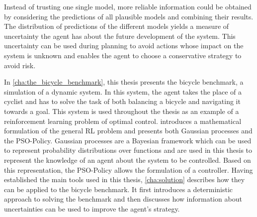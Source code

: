 Instead of trusting one single model, more reliable information could be obtained by considering the predictions of all plausible models and combining their results.
The distribution of predictions of the different models yields a measure of uncertainty the agent has about the future development of the system.
This uncertainty can be used during planning to avoid actions whose impact on the system is unknown and enables the agent to choose a conservative strategy to avoid risk.

In \cref{cha:the_bicycle_benchmark}, this thesis presents the bicycle benchmark, a simulation of a dynamic system.
In this system, the agent takes the place of a cyclist and has to solve the task of both balancing a bicycle and navigating it towards a goal.
This system is used throughout the thesis as an example of a reinforcement learning problem of optimal control.
 introduces a mathematical formulation of the general RL problem and presents both Gaussian processes and the PSO-Policy.
Gaussian processes are a Bayesian framework which can be used to represent probability distributions over functions and are used in this thesis to represent the knowledge of an agent about the system to be controlled.
Based on this representation, the PSO-Policy allows the formulation of a controller.
Having established the main tools used in this thesis, \cref{cha:solution} describes how they can be applied to the bicycle benchmark.
It first introduces a deterministic approach to solving the benchmark and then discusses how information about uncertainties can be used to improve the agent's strategy.
